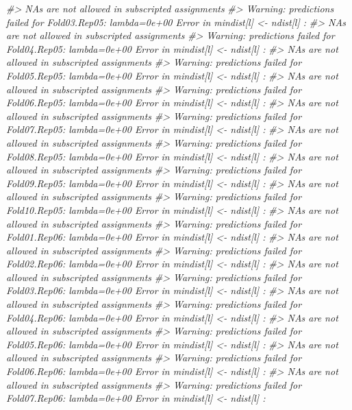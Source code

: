 \documentclass[]{book}
\newenvironment{Shaded}{\begin{snugshade}}{\end{snugshade}}
\newcommand{\CommentTok}[1]{\textcolor[rgb]{0.56,0.35,0.01}{\textit{#1}}}
\begin{document}
\begin{Shaded}
\begin{Highlighting}[]
\CommentTok{#>   NAs are not allowed in subscripted assignments}
\CommentTok{#> Warning: predictions failed for Fold03.Rep05: lambda=0e+00 Error in mindist[l] <- ndist[l] : }
\CommentTok{#>   NAs are not allowed in subscripted assignments}
\CommentTok{#> Warning: predictions failed for Fold04.Rep05: lambda=0e+00 Error in mindist[l] <- ndist[l] : }
\CommentTok{#>   NAs are not allowed in subscripted assignments}
\CommentTok{#> Warning: predictions failed for Fold05.Rep05: lambda=0e+00 Error in mindist[l] <- ndist[l] : }
\CommentTok{#>   NAs are not allowed in subscripted assignments}
\CommentTok{#> Warning: predictions failed for Fold06.Rep05: lambda=0e+00 Error in mindist[l] <- ndist[l] : }
\CommentTok{#>   NAs are not allowed in subscripted assignments}
\CommentTok{#> Warning: predictions failed for Fold07.Rep05: lambda=0e+00 Error in mindist[l] <- ndist[l] : }
\CommentTok{#>   NAs are not allowed in subscripted assignments}
\CommentTok{#> Warning: predictions failed for Fold08.Rep05: lambda=0e+00 Error in mindist[l] <- ndist[l] : }
\CommentTok{#>   NAs are not allowed in subscripted assignments}
\CommentTok{#> Warning: predictions failed for Fold09.Rep05: lambda=0e+00 Error in mindist[l] <- ndist[l] : }
\CommentTok{#>   NAs are not allowed in subscripted assignments}
\CommentTok{#> Warning: predictions failed for Fold10.Rep05: lambda=0e+00 Error in mindist[l] <- ndist[l] : }
\CommentTok{#>   NAs are not allowed in subscripted assignments}
\CommentTok{#> Warning: predictions failed for Fold01.Rep06: lambda=0e+00 Error in mindist[l] <- ndist[l] : }
\CommentTok{#>   NAs are not allowed in subscripted assignments}
\CommentTok{#> Warning: predictions failed for Fold02.Rep06: lambda=0e+00 Error in mindist[l] <- ndist[l] : }
\CommentTok{#>   NAs are not allowed in subscripted assignments}
\CommentTok{#> Warning: predictions failed for Fold03.Rep06: lambda=0e+00 Error in mindist[l] <- ndist[l] : }
\CommentTok{#>   NAs are not allowed in subscripted assignments}
\CommentTok{#> Warning: predictions failed for Fold04.Rep06: lambda=0e+00 Error in mindist[l] <- ndist[l] : }
\CommentTok{#>   NAs are not allowed in subscripted assignments}
\CommentTok{#> Warning: predictions failed for Fold05.Rep06: lambda=0e+00 Error in mindist[l] <- ndist[l] : }
\CommentTok{#>   NAs are not allowed in subscripted assignments}
\CommentTok{#> Warning: predictions failed for Fold06.Rep06: lambda=0e+00 Error in mindist[l] <- ndist[l] : }
\CommentTok{#>   NAs are not allowed in subscripted assignments}
\CommentTok{#> Warning: predictions failed for Fold07.Rep06: lambda=0e+00 Error in mindist[l] <- ndist[l] : }

\end{Highlighting}
\end{Shaded}
\end{document}
